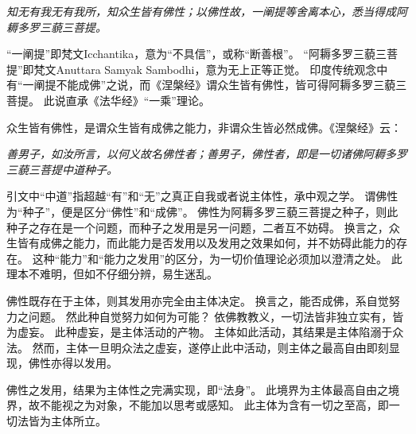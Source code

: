 \documentclass[11pt]{article}
\begin{document}
\textit{知无有我无有我所，知众生皆有佛性；以佛性故，一阐提等舍离本心，悉当得成阿耨多罗三藐三菩提。}

“一阐提”即梵文Icchantika，意为“不具信”，或称“断善根”。
“阿耨多罗三藐三菩提”即梵文Anuttara Samyak Sambodhi，意为无上正等正觉。
印度传统观念中有“一阐提不能成佛”之说，而《涅槃经》谓众生皆有佛性，皆可得阿耨多罗三藐三菩提。
此说直承《法华经》“一乘”理论。

\par

众生皆有佛性，是谓众生皆有成佛之能力，非谓众生皆必然成佛。《涅槃经》云：

\textit{善男子，如汝所言，以何义故名佛性者；善男子，佛性者，即是一切诸佛阿耨多罗三藐三菩提中道种子。}

引文中“中道”指超越“有”和“无”之真正自我或者说主体性，承中观之学。
谓佛性为“种子”，便是区分“佛性”和“成佛”。
佛性为阿耨多罗三藐三菩提之种子，则此种子之存在是一个问题，而种子之发用是另一问题，二者互不妨碍。
换言之，众生皆有成佛之能力，而此能力是否发用以及发用之效果如何，并不妨碍此能力的存在。
这种“能力”和“能力之发用”的区分，为一切价值理论必须加以澄清之处。
此理本不难明，但如不仔细分辨，易生迷乱。

\par

佛性既存在于主体，则其发用亦完全由主体决定。
换言之，能否成佛，系自觉努力之问题。
然此种自觉努力如何为可能？
依佛教教义，一切法皆非独立实有，皆为虚妄。
此种虚妄，是主体活动的产物。
主体如此活动，其结果是主体陷溺于众法。
然而，主体一旦明众法之虚妄，遂停止此中活动，则主体之最高自由即刻显现，佛性亦得以发用。

\par

佛性之发用，结果为主体性之完满实现，即“法身”。
此境界为主体最高自由之境界，故不能视之为对象，不能加以思考或感知。
此主体为含有一切之至高，即一切法皆为主体所立。
  
\end{document}
